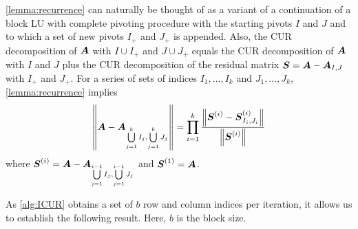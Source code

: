 \cref{lemma:recurrence} can naturally be thought of as a variant of a continuation of a block LU with complete pivoting procedure with the starting pivots $I$ and $J$ and to which a set of new pivots $I_+$ and $J_+$ is appended. Also, the CUR decomposition of $\boldsymbol{A}$ with $I\cup I_+$ and $J\cup J_+$ equals the CUR decomposition of $\boldsymbol{A}$ with $I$ and $J$ plus the CUR decomposition of the residual matrix $\boldsymbol{S} = \boldsymbol{A}-\boldsymbol{A}_{I,J}$ with $I_+$ and $J_+$. For a series of sets of indices $I_1,..., I_k$ and $J_1,..., J_k$, \cref{lemma:recurrence} implies
\begin{equation} \label{eq:recurrencenorm}
    \norm{\mat{A} - \mat{A}_{\bigcup\limits_{j=1}^k I_j,\bigcup\limits_{j=1}^k J_j}} = \prod_{i = 1}^k \frac{\norm{\mat{S}^{(i)} - \mat{S}_{I_i,J_i}^{(i)}}}{\norm{\mat{S}^{(i)}}}
\end{equation} where $\boldsymbol{S}^{(i)} = \boldsymbol{A} - \boldsymbol{A}_{\bigcup\limits_{j=1}^{i-1} I_j,\bigcup\limits_{j=1}^{i-1} J_j}$ and $\boldsymbol{S}^{(1)} = \boldsymbol{A}$.


As \cref{alg:ICUR} obtains a set of $b$ row and column indices per iteration, it allows us to establish the following result. Here, $b$ is the block size.


